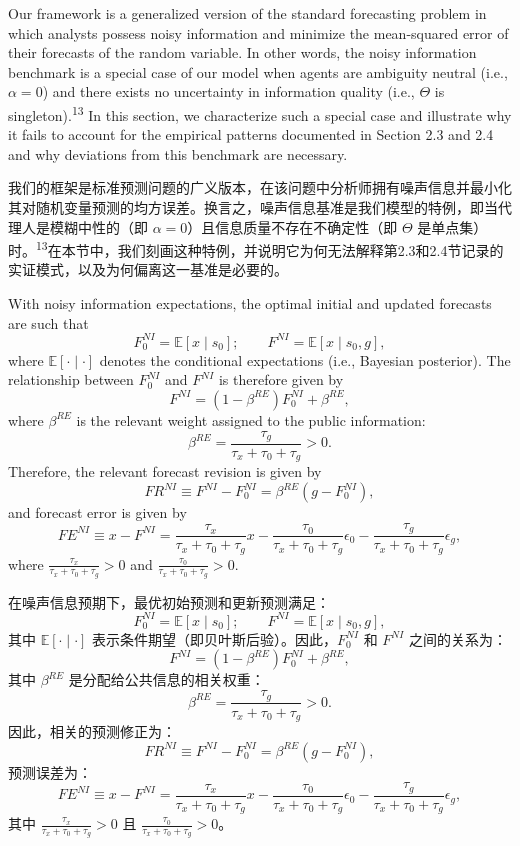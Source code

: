 \documentclass[12pt,a4paper]{article}
\newenvironment{original}
  {\par\medskip\noindent\ignorespaces}
  {\par\medskip}
\newenvironment{translation}
  {\par\noindent{\color{transblue}\ignorespaces}}
  {\par\bigskip}
\begin{document}
\begin{original}
Our framework is a generalized version of the standard forecasting problem in which analysts possess noisy information and minimize the mean-squared error of their forecasts of the random variable. In other words, the noisy information benchmark is a special case of our model when agents are ambiguity neutral (i.e., $\alpha = 0$) and there exists no uncertainty in information quality (i.e., $\Theta$ is singleton).\textsuperscript{13} In this section, we characterize such a special case and illustrate why it fails to account for the empirical patterns documented in Section 2.3 and 2.4 and why deviations from this benchmark are necessary.
\end{original}
\begin{translation}
我们的框架是标准预测问题的广义版本，在该问题中分析师拥有噪声信息并最小化其对随机变量预测的均方误差。换言之，噪声信息基准是我们模型的特例，即当代理人是模糊中性的（即 $\alpha = 0$）且信息质量不存在不确定性（即 $\Theta$ 是单点集）时。\textsuperscript{13}在本节中，我们刻画这种特例，并说明它为何无法解释第2.3和2.4节记录的实证模式，以及为何偏离这一基准是必要的。
\end{translation}

\begin{original}
With noisy information expectations, the optimal initial and updated forecasts are such that
\[
F_0^{NI} = \mathbb{E}[x \mid s_0]; \qquad F^{NI} = \mathbb{E}[x \mid s_0, g],
\]
where $\mathbb{E}[\cdot \mid \cdot]$ denotes the conditional expectations (i.e., Bayesian posterior). The relationship between $F_0^{NI}$ and $F^{NI}$ is therefore given by
\[
F^{NI} = (1 - \beta^{RE})F_0^{NI} + \beta^{RE},
\]
where $\beta^{RE}$ is the relevant weight assigned to the public information:
\[
\beta^{RE} = \frac{\tau_g}{\tau_x + \tau_0 + \tau_g} > 0. \tag{6}
\]
Therefore, the relevant forecast revision is given by
\[
FR^{NI} \equiv F^{NI} - F_0^{NI} = \beta^{RE}(g - F_0^{NI}), \tag{7}
\]
and forecast error is given by
\[
FE^{NI} \equiv x - F^{NI} = \frac{\tau_x}{\tau_x + \tau_0 + \tau_g} x - \frac{\tau_0}{\tau_x + \tau_0 + \tau_g} \epsilon_0 - \frac{\tau_g}{\tau_x + \tau_0 + \tau_g} \epsilon_g, \tag{8}
\]
where $\frac{\tau_x}{\tau_x+\tau_0+\tau_g} > 0$ and $\frac{\tau_0}{\tau_x+\tau_0+\tau_g} > 0$.
\end{original}
\begin{translation}
在噪声信息预期下，最优初始预测和更新预测满足：
\[
F_0^{NI} = \mathbb{E}[x \mid s_0]; \qquad F^{NI} = \mathbb{E}[x \mid s_0, g],
\]
其中 $\mathbb{E}[\cdot \mid \cdot]$ 表示条件期望（即贝叶斯后验）。因此，$F_0^{NI}$ 和 $F^{NI}$ 之间的关系为：
\[
F^{NI} = (1 - \beta^{RE})F_0^{NI} + \beta^{RE},
\]
其中 $\beta^{RE}$ 是分配给公共信息的相关权重：
\[
\beta^{RE} = \frac{\tau_g}{\tau_x + \tau_0 + \tau_g} > 0. \tag{6}
\]
因此，相关的预测修正为：
\[
FR^{NI} \equiv F^{NI} - F_0^{NI} = \beta^{RE}(g - F_0^{NI}), \tag{7}
\]
预测误差为：
\[
FE^{NI} \equiv x - F^{NI} = \frac{\tau_x}{\tau_x + \tau_0 + \tau_g} x - \frac{\tau_0}{\tau_x + \tau_0 + \tau_g} \epsilon_0 - \frac{\tau_g}{\tau_x + \tau_0 + \tau_g} \epsilon_g, \tag{8}
\]
其中 $\frac{\tau_x}{\tau_x+\tau_0+\tau_g} > 0$ 且 $\frac{\tau_0}{\tau_x+\tau_0+\tau_g} > 0$。
\end{translation}
\end{document}
